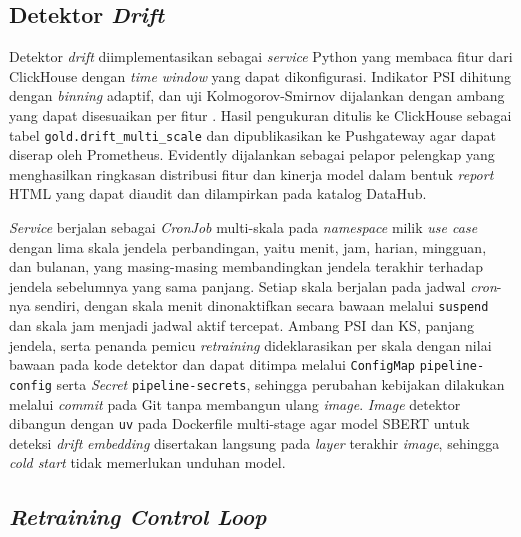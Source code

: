 \subsection{Detektor \textit{Drift}}
\label{subsec:impl-detektor}

Detektor \textit{drift} diimplementasikan sebagai \textit{service} Python yang membaca fitur dari ClickHouse dengan \textit{time window} yang dapat dikonfigurasi. Indikator PSI dihitung dengan \textit{binning} adaptif, dan uji Kolmogorov-Smirnov dijalankan dengan ambang yang dapat disesuaikan per fitur \autocite{reis2016kdd, bayram2022concept, lu2019learning}. Hasil pengukuran ditulis ke ClickHouse sebagai tabel \texttt{gold.drift\_multi\_scale} dan dipublikasikan ke Pushgateway agar dapat diserap oleh Prometheus. Evidently \autocite{evidently2025} dijalankan sebagai pelapor pelengkap yang menghasilkan ringkasan distribusi fitur dan kinerja model dalam bentuk \textit{report} HTML yang dapat diaudit dan dilampirkan pada katalog DataHub.

\textit{Service} berjalan sebagai \textit{CronJob} multi-skala pada \textit{namespace} milik \textit{use case} dengan lima skala jendela perbandingan, yaitu menit, jam, harian, mingguan, dan bulanan, yang masing-masing membandingkan jendela terakhir terhadap jendela sebelumnya yang sama panjang. Setiap skala berjalan pada jadwal \textit{cron}-nya sendiri, dengan skala menit dinonaktifkan secara bawaan melalui \texttt{suspend} dan skala jam menjadi jadwal aktif tercepat. Ambang PSI dan KS, panjang jendela, serta penanda pemicu \textit{retraining} dideklarasikan per skala dengan nilai bawaan pada kode detektor dan dapat ditimpa melalui \texttt{ConfigMap} \texttt{pipeline-config} serta \textit{Secret} \texttt{pipeline-secrets}, sehingga perubahan kebijakan dilakukan melalui \textit{commit} pada Git tanpa membangun ulang \textit{image}. \textit{Image} detektor dibangun dengan \texttt{uv} pada Dockerfile multi-stage agar model SBERT untuk deteksi \textit{drift} \textit{embedding} disertakan langsung pada \textit{layer} terakhir \textit{image}, sehingga \textit{cold start} tidak memerlukan unduhan model.

\subsection{\textit{Retraining Control Loop}}
\label{subsec:impl-control-loop}

